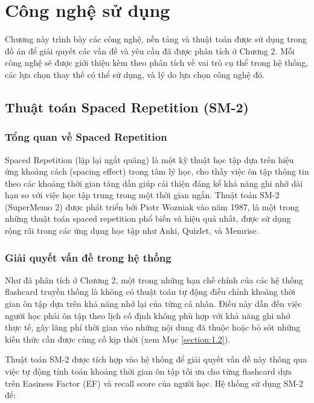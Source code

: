 \documentclass[../DoAn.tex]{subfiles}
\begin{document}
\chapter{Công nghệ sử dụng}
\label{chapter:3}

Chương này trình bày các công nghệ, nền tảng và thuật toán được sử dụng trong đồ án để giải quyết các vấn đề và yêu cầu đã được phân tích ở Chương 2. Mỗi công nghệ sẽ được giới thiệu kèm theo phân tích về vai trò cụ thể trong hệ thống, các lựa chọn thay thế có thể sử dụng, và lý do lựa chọn công nghệ đó.

\section{Thuật toán Spaced Repetition (SM-2)}
\label{section:3.1}

\subsection{Tổng quan về Spaced Repetition}

Spaced Repetition (lặp lại ngắt quãng) là một kỹ thuật học tập dựa trên hiệu ứng khoảng cách (spacing effect) trong tâm lý học, cho thấy việc ôn tập thông tin theo các khoảng thời gian tăng dần giúp cải thiện đáng kể khả năng ghi nhớ dài hạn so với việc học tập trung trong một thời gian ngắn. Thuật toán SM-2 (SuperMemo 2) được phát triển bởi Piotr Wozniak vào năm 1987, là một trong những thuật toán spaced repetition phổ biến và hiệu quả nhất, được sử dụng rộng rãi trong các ứng dụng học tập như Anki, Quizlet, và Memrise.

\subsection{Giải quyết vấn đề trong hệ thống}

Như đã phân tích ở Chương 2, một trong những hạn chế chính của các hệ thống flashcard truyền thống là không có thuật toán tự động điều chỉnh khoảng thời gian ôn tập dựa trên khả năng nhớ lại của từng cá nhân. Điều này dẫn đến việc người học phải ôn tập theo lịch cố định không phù hợp với khả năng ghi nhớ thực tế, gây lãng phí thời gian vào những nội dung đã thuộc hoặc bỏ sót những kiến thức cần được củng cố kịp thời (xem Mục \ref{section:1.2}).

Thuật toán SM-2 được tích hợp vào hệ thống để giải quyết vấn đề này thông qua việc tự động tính toán khoảng thời gian ôn tập tối ưu cho từng flashcard dựa trên Easiness Factor (EF) và recall score của người học. Hệ thống sử dụng SM-2 để:
\end{document}

